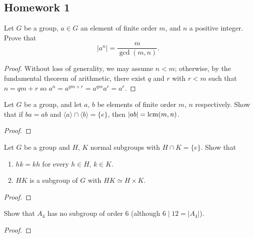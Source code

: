\newpage

\subsection{Homework 1}
\begin{problem}
  Let $G$ be a group, $a\in G$ an element of finite order $m$, and $n$ a
  positive integer. Prove that
  \[
    |a^n|=\frac{m}{\gcd(m,n)}.
  \]
\end{problem}
\begin{proof}
  Without loss of generality, we may assume $n<m$; otherwise, by the
  fundamental theorem of arithmetic, there exist $q$ and $r$ with $r<m$
  such that $n=qm+r$ so $a^n=a^{qm+r}=a^{qm}a^r=a^r$.
\end{proof}

\begin{problem}
  Let $G$ be a group, and let $a$, $b$ be elements of finite order $m$, $n$
  respectively. Show that if $ba=ab$ and
  $\langle a\rangle\cap\langle b\rangle=\{e\}$, then $|ab|=\operatorname{lcm}(m,n)$.
\end{problem}
\begin{proof}
\end{proof}

\begin{problem}
  Let $G$ be a group and $H$, $K$ normal subgroups with $H\cap
  K=\{e\}$. Show that
  \begin{enumerate}[label=(\alph*),noitemsep]
  \item $hk=kh$ for every $h\in H$, $k\in K$.
  \item $HK$ is a subgroup of $G$ with $HK\simeq H\times K$.
  \end{enumerate}
\end{problem}
\begin{proof}
\end{proof}

\begin{problem}
  Show that $A_4$ has no subgroup of order $6$ (although $6\mid 12=|A_4|$).
\end{problem}
\begin{proof}
\end{proof}

